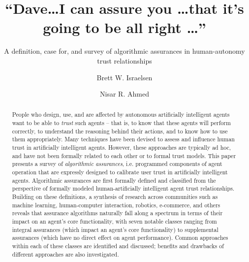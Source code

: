 \documentclass[format=manuscript, screen,review=true]{acmart}
\begin{document}
\title{``Dave\ldots I can assure you \ldots that it's going to be all right \ldots''} 
\subtitle{A definition, case for, and survey of algorithmic assurances in human-autonomy trust relationships}
\author{Brett W. Israelsen}
\author{Nisar R. Ahmed}

\begin{abstract}
    People who design, use, and are affected by autonomous artificially intelligent agents want to be able to \emph{trust} such agents -- that is, to know that these agents will perform correctly, to understand the reasoning behind their actions, and to know how to use them appropriately. 
    Many techniques have been devised to assess and influence human trust in artificially intelligent agents. However, these approaches are typically ad hoc, and have not been formally related to each other or to formal trust models. This paper presents a survey of \emph{algorithmic assurances}, i.e. programmed components of agent operation that are expressly designed to calibrate user trust in artificially intelligent agents. 
    Algorithmic assurances are first formally defined and classified from the perspective of formally modeled human-artificially intelligent agent trust relationships. Building on these definitions, a synthesis of research across communities such as machine learning, human-computer interaction, robotics, e-commerce, and others reveals that assurance algorithms naturally fall along a spectrum in terms of their impact on an agent's core functionality, with seven notable classes ranging from integral assurances (which impact an agent's core functionality) to supplemental assurances (which have no direct effect on agent performance). Common approaches within each of these classes are identified and discussed; benefits and drawbacks of different approaches are also investigated. %
\end{abstract}
\end{document}
